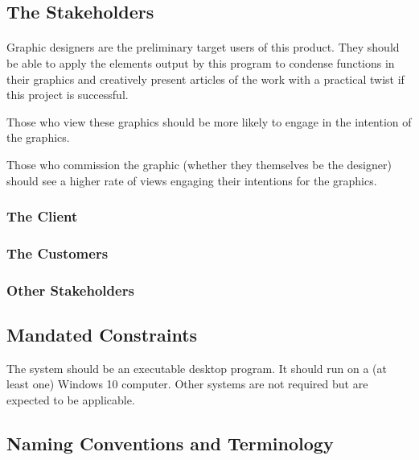 \documentclass[12pt, titlepage]{article}
\begin{document}
\subsection{The Stakeholders}

	\paragraph{}
		Graphic designers are the preliminary target users of this product. 
		They should be able to apply the elements output by this program to 
		condense functions in their graphics and creatively present articles of 
		the work with a practical twist if this project is successful.
		
		Those who view these graphics should be more likely to engage in the 
		intention of the graphics.
		
		Those who commission the graphic (whether they themselves be the 
		designer) should see a higher rate of views engaging their intentions 
		for the graphics.
		
	
\subsubsection{The Client}

\subsubsection{The Customers}

\subsubsection{Other Stakeholders}

\subsection{Mandated Constraints}

	The system should be an executable desktop program. It should run on a (at 
	least one) Windows 10 computer. Other systems are not required but are 
	expected to be applicable.

\subsection{Naming Conventions and Terminology}

		\paragraph{}
		
\end{document}
